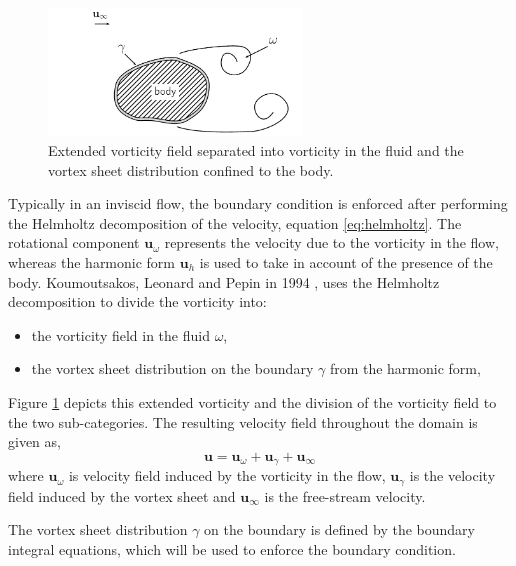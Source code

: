 	\begin{figure}[!t]
	\centering
	\includegraphics[width=0.6\textwidth]{figures/lagrangian/noSlipVorticityField.pdf}
	\caption{Extended vorticity field separated into vorticity in the fluid and the vortex sheet distribution confined to the body.}
	\label{fig:noSlipVorticityField}
	\end{figure}

Typically in an inviscid flow, the boundary condition is enforced after performing the Helmholtz decomposition of the velocity, equation \ref{eq:helmholtz}. The rotational component $\mathbf{u}_{\omega}$ represents the velocity due to the vorticity in the flow, whereas the harmonic form $\mathbf{u}_h$ is used to take in account of the presence of the body. Koumoutsakos, Leonard and Pepin in 1994 \cite{Koumoutsakos1994b}, uses the Helmholtz decomposition to divide the vorticity into: 
\begin{itemize}
\item the vorticity field in the fluid $\omega$,
\item the vortex sheet distribution on the boundary $\gamma$ from the harmonic form,
\end{itemize}
Figure \ref{fig:noSlipVorticityField} depicts this extended vorticity and the division of the vorticity field to the two sub-categories. The resulting velocity field throughout the domain is given as,
\begin{equation}
\mathbf{u} = \mathbf{u}_{\omega} + \mathbf{u}_{\gamma} + \mathbf{u}_{\infty}
\label{eq:la_noslipbcsimple}
\end{equation}
where $\mathbf{u}_{\omega}$ is velocity field induced by the vorticity in the flow, $\mathbf{u}_{\gamma}$ is the velocity field induced by the vortex sheet and $\mathbf{u}_{\infty}$ is the free-stream velocity.

The vortex sheet distribution $\gamma$ on the boundary is defined by the boundary integral equations, which will be used to enforce the boundary condition.

